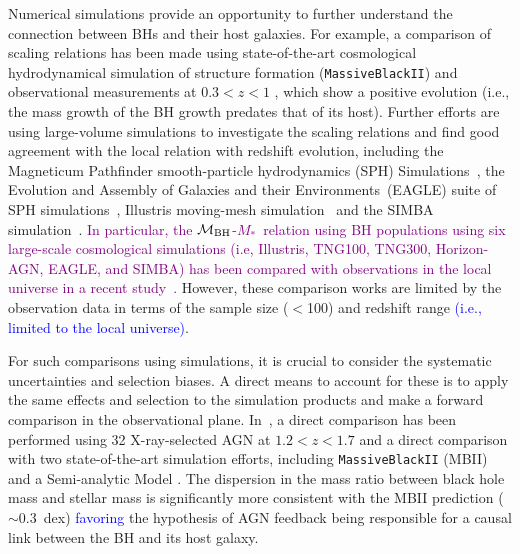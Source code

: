\documentclass[twocolumn]{aastex631}
\newcommand{\jshi}[1]{\textcolor{orange}{#1}}
\newcommand{\blue}[1]{\textcolor{blue}{#1}}
\newcommand{\yo}[1]{\textcolor{purple}{[{\bf Yohan}: #1]}}
\newcommand{\red}[1]{\textcolor{purple}{#1}}
\def\smass{{$M_*$}}
\def\mbh{$\mathcal M_{\rm BH}$}
\begin{document}
Numerical simulations provide an opportunity to further understand the connection between BHs and their host galaxies. For example, a comparison of scaling relations has been made using state-of-the-art cosmological hydrodynamical simulation of structure formation ({\tt MassiveBlackII}) and observational measurements at  $0.3<z<1$ \citep[e.g., ][]{DeG++15}, which show a positive evolution (i.e., the mass growth of the BH growth predates that of its host). Further efforts are using large-volume simulations to investigate the scaling relations and find good agreement with the local relation with redshift evolution, 
including the Magneticum Pathfinder smooth-particle hydrodynamics (SPH) Simulations~\citep{Steinborn2015}, the Evolution and Assembly of Galaxies and their Environments~(EAGLE) suite of SPH simulations~\citep{Schaye2015}, Illustris moving-mesh simulation~\citep{Sijacki2015, 2014MNRAS.444.1518V, Li2019} and the SIMBA simulation~\citep{Thomas2019}. %
\red{In particular, the \mbh-\smass\ relation using BH populations using six large-scale cosmological simulations (i.e, Illustris, TNG100, TNG300, Horizon-AGN, EAGLE, and SIMBA) has been compared with observations in the local universe in a recent study~\citep{Habouzit2021}.} However, these comparison works are limited by the observation data in terms of the sample size ($<$100) and redshift range \blue{(i.e., limited to the local universe)}.

For such comparisons using simulations, it is crucial to consider the systematic uncertainties and selection biases. A direct means to account for these is to apply the same effects and selection to the simulation products and make a forward comparison in the observational plane. In~\citet{Ding2020b}, a direct comparison has been performed using 32 X-ray-selected AGN at $1.2<z<1.7$ and a direct comparison with two state-of-the-art simulation efforts, including {\tt MassiveBlackII} (MBII) and a Semi-analytic Model \citep[SAM,][]{Menci2014, Menci2016}. The dispersion in the mass ratio between black hole mass and stellar mass is significantly more consistent with the MBII prediction ($\sim0.3$~dex) \blue{favoring} the hypothesis of AGN feedback being responsible for a causal link between the BH and its host galaxy.
\end{document}
